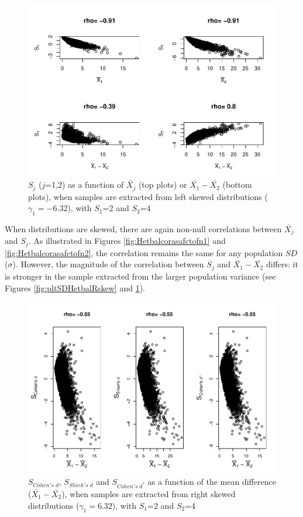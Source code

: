 \documentclass[
  english,
  man,mask]{apa6}
\begin{document}
\begin{figure}
\centering
\includegraphics{Correlation_files/figure-latex/pltSDHetbalLskew-1.pdf}
\caption{\label{fig:pltSDHetbalLskew}\(S_j\) (\(j\)=1,2) as a function of \(\bar{X_j}\) (top plots) or \(\bar{X_1}-\bar{X_2}\) (bottom plots), when samples are extracted from left skewed distributions (\(\gamma_1 = -6.32\)), with \(S_1\)=2 and \(S_2\)=4}
\end{figure}

When distributions are skewed, there are again non-null correlations between \(\bar{X_j}\) and \(S_j\). As illustrated in Figures \ref{fig:Hetbalcorasafctofn1} and \ref{fig:Hetbalcorasafctofn2}, the correlation remains the same for any population \(SD\) (\(\sigma\)). However, the magnitude of the correlation between \(S_j\) and \(\bar{X_1}-\bar{X_2}\) differs: it is stronger in the sample extracted from the larger population variance (see Figures \ref{fig:pltSDHetbalRskew} and \ref{fig:pltSDHetbalLskew}).

\begin{figure}
\centering
\includegraphics{Correlation_files/figure-latex/pltStdzrHetbalRskew-1.pdf}
\caption{\label{fig:pltStdzrHetbalRskew}\(S_{Cohen's \; d}\), \(S_{Shieh's \; d}\) and \(S_{Cohen's \; d^*}\) as a function of the mean difference (\(\bar{X_1}-\bar{X_2}\)), when samples are extracted from right skewed distributions (\(\gamma_1 = 6.32\)), with \(S_1\)=2 and \(S_2\)=4}
\end{figure}
\end{document}
